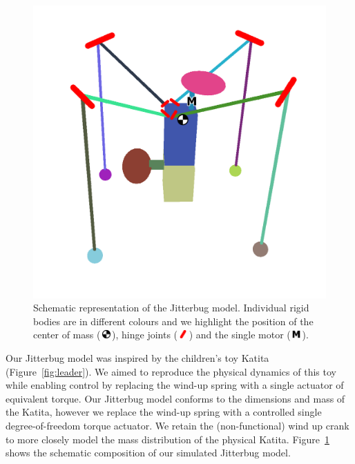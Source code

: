 \documentclass[letterpaper, 10 pt, conference]{ieeeconf}
\newcommand{\com}{\,\includegraphics[width=9pt]{ico-com}\,}
\newcommand{\hinge}{\,\includegraphics[width=9pt]{ico-hinge}\,}
\newcommand{\motor}{\,\includegraphics[width=9pt]{ico-motor}\,}
\begin{document}
\begin{figure}[t]
    \centering
    \includegraphics[width=\linewidth]{fig-jitterbug-parts}
    \caption[
        Schematic representation of the Jitterbug model.
        Individual rigid bodies are in different colours and we highlight the position of the center of mass, hinge joints and the single motor.
    ]{
        Schematic representation of the Jitterbug model.
        Individual rigid bodies are in different colours and we highlight the position of the center of mass (\protect\com), hinge joints  (\protect\hinge) and the single motor (\protect\motor).
    }
    \label{fig:parts}
\end{figure}

Our Jitterbug model was inspired by the children's toy Katita (Figure~\ref{fig:leader}).
We aimed to reproduce the physical dynamics of this toy while enabling control by replacing the wind-up spring with a single actuator of equivalent torque.
Our Jitterbug model conforms to the dimensions and mass of the Katita, however we replace the wind-up spring with a controlled single degree-of-freedom torque actuator.
We retain the (non-functional) wind up crank to more closely model the mass distribution of the physical Katita.
Figure~\ref{fig:parts} shows the schematic composition of our simulated Jitterbug model.
\end{document}
